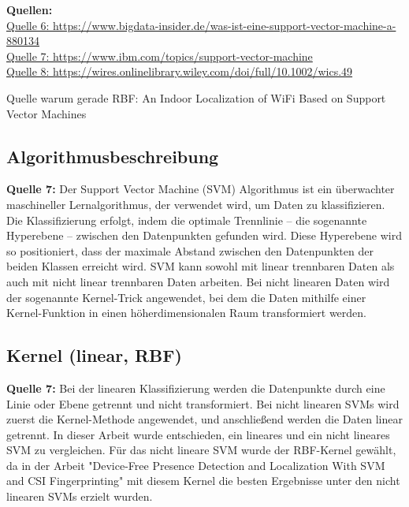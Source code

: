 \textbf{Quellen:} \\
\href{https://www.bigdata-insider.de/was-ist-eine-support-vector-machine-a-880134}{Quelle 6: https://www.bigdata-insider.de/was-ist-eine-support-vector-machine-a-880134} \\
\href{https://www.ibm.com/topics/support-vector-machine}{Quelle 7: https://www.ibm.com/topics/support-vector-machine} \\
\href{https://wires.onlinelibrary.wiley.com/doi/full/10.1002/wics.49}{Quelle 8: https://wires.onlinelibrary.wiley.com/doi/full/10.1002/wics.49}


Quelle warum gerade RBF: An Indoor Localization of WiFi Based on Support Vector Machines

\subsection{Algorithmusbeschreibung}
\textbf{Quelle 7:} Der Support Vector Machine (SVM) Algorithmus ist ein überwachter maschineller Lernalgorithmus, der verwendet wird, um Daten zu klassifizieren. Die Klassifizierung erfolgt, indem die optimale Trennlinie – die sogenannte Hyperebene – zwischen den Datenpunkten gefunden wird. Diese Hyperebene wird so positioniert, dass der maximale Abstand zwischen den Datenpunkten der beiden Klassen erreicht wird. SVM kann sowohl mit linear trennbaren Daten als auch mit nicht linear trennbaren Daten arbeiten. Bei nicht linearen Daten wird der sogenannte Kernel-Trick angewendet, bei dem die Daten mithilfe einer Kernel-Funktion in einen höherdimensionalen Raum transformiert werden.

\subsection{Kernel (linear, RBF)}
\textbf{Quelle 7:} Bei der linearen Klassifizierung werden die Datenpunkte durch eine Linie oder Ebene getrennt und nicht transformiert. Bei nicht linearen SVMs wird zuerst die Kernel-Methode angewendet, und anschließend werden die Daten linear getrennt. In dieser Arbeit wurde entschieden, ein lineares und ein nicht lineares SVM zu vergleichen. Für das nicht lineare SVM wurde der RBF-Kernel gewählt, da in der Arbeit "Device-Free Presence Detection and Localization With SVM and CSI Fingerprinting" mit diesem Kernel die besten Ergebnisse unter den nicht linearen SVMs erzielt wurden.


